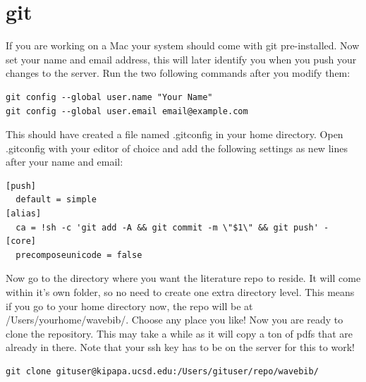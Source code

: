 \documentclass[11pt, oneside]{article}   	%
\begin{document}
\section{git}
If you are working on a Mac your system should come with git pre-installed. Now set your name and email address, this will later identify you when you push your changes to the server. Run the two following commands after you modify them:
\begin{verbatim}
git config --global user.name "Your Name"
git config --global user.email email@example.com
\end{verbatim}
This should have created a file named .gitconfig in your home directory. Open .gitconfig with your editor of choice and add the following settings as new lines after your name and email:
\begin{verbatim}
[push]
  default = simple
[alias]
  ca = !sh -c 'git add -A && git commit -m \"$1\" && git push' -
[core]
  precomposeunicode = false
\end{verbatim}

Now go to the directory where you want the literature repo to reside. It will come within it's own folder, so no need to create one extra directory level. This means if you go to your home directory now, the repo will be at /Users/yourhome/wavebib/. Choose any place you like! Now you are ready to clone the repository. This may take a while as it will copy a ton of pdfs that are already in there. Note that your ssh key has to be on the server for this to work!
\begin{verbatim}
git clone gituser@kipapa.ucsd.edu:/Users/gituser/repo/wavebib/
\end{verbatim}



%
%
%
%
%
%
%
%
%
%
\end{document}

